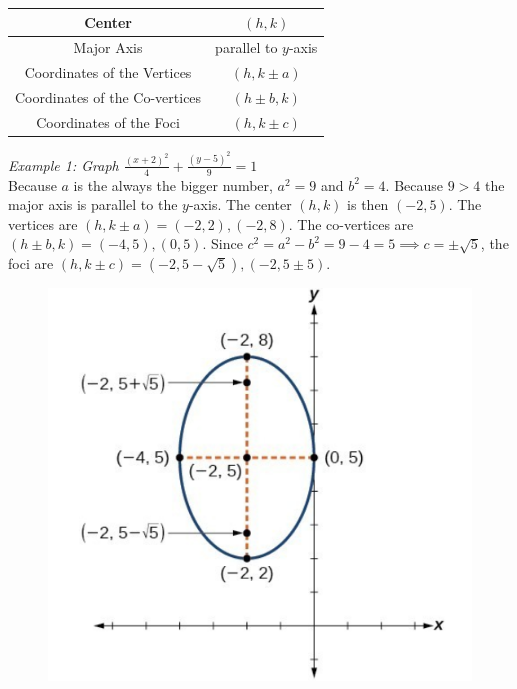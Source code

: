         \begin{center}
            \begin{tabular} {|c|c|}
                \hline
                Center                         & $(h,k)$              \\
                \hline
                Major Axis                     & parallel to $y$-axis \\
                \hline
                Coordinates of the Vertices    & $(h, k\pm a)$        \\
                \hline
                Coordinates of the Co-vertices & $(h\pm b, k)$        \\
                \hline
                Coordinates of the Foci        & $(h, k\pm c)$        \\
                \hline
            \end{tabular}
        \end{center}

        \noindent \color{blue} \textit{Example 1: Graph $\frac{(x+2)^2}{4}+\frac{(y-5)^2}{9}=1$}
        \color{black} \\
        \noindent Because $a$ is the always the bigger number, $a^2=9$ and $b^2=4$. Because
        $9>4$ the major axis is parallel to the $y$-axis. The center $(h,k)$ is then $(-2,5)$. The
        vertices are $(h,k\pm a)=(-2,2),(-2,8)$. The co-vertices are $(h\pm b,k)=(-4,5),(0,5)$.
        Since $c^2=a^2-b^2=9-4=5\implies c=\pm\sqrt{5}$, the foci are $(h,k\pm c)=(-2,5-\sqrt{5}),
        (-2,5\pm 5)$. \\

        \begin{figure} [hbt!]
            \centering
            \includegraphics [scale=0.5] {Resources/Unit10Conics/ellipse2.PNG}
        \end{figure}

